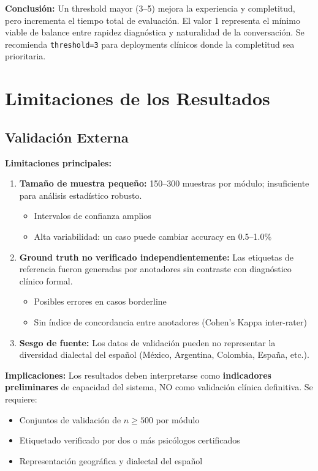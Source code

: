 \textbf{Conclusión:}
Un threshold mayor (3–5) mejora la experiencia y completitud, pero incrementa el
tiempo total de evaluación. El valor 1 representa el mínimo viable de balance entre
rapidez diagnóstica y naturalidad de la conversación. Se recomienda \texttt{threshold=3}
para deployments clínicos donde la completitud sea prioritaria.

\section{Limitaciones de los Resultados}

\subsection{Validación Externa}

\textbf{Limitaciones principales:}
\begin{enumerate}
    \item \textbf{Tamaño de muestra pequeño:} 150–300 muestras por módulo; insuficiente
          para análisis estadístico robusto.
    \begin{itemize}
        \item Intervalos de confianza amplios
        \item Alta variabilidad: un caso puede cambiar accuracy en 0.5–1.0\%
    \end{itemize}

    \item \textbf{Ground truth no verificado independientemente:} Las etiquetas de
          referencia fueron generadas por anotadores sin contraste con diagnóstico
          clínico formal.
    \begin{itemize}
        \item Posibles errores en casos borderline
        \item Sin índice de concordancia entre anotadores (Cohen's Kappa inter-rater)
    \end{itemize}

    \item \textbf{Sesgo de fuente:} Los datos de validación pueden no representar la
          diversidad dialectal del español (México, Argentina, Colombia, España, etc.).
\end{enumerate}

\textbf{Implicaciones:}
Los resultados deben interpretarse como \textbf{indicadores preliminares} de capacidad
del sistema, NO como validación clínica definitiva. Se requiere:
\begin{itemize}
    \item Conjuntos de validación de $n \geq 500$ por módulo
    \item Etiquetado verificado por dos o más psicólogos certificados
    \item Representación geográfica y dialectal del español
\end{itemize}

